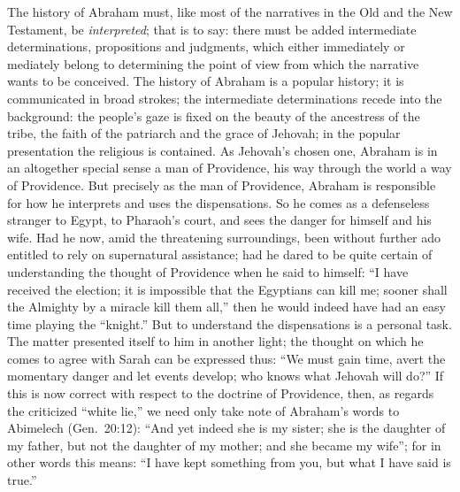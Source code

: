 \documentclass[12pt]{book}
\newcommand{\opage}[1]{\marginnote{\footnotesize\textit{[#1]}}}
\begin{document}
The history of Abraham must, like most of the narratives in the Old and
the New Testament, be \emph{interpreted}; that is to say: there must be
added intermediate determinations, propositions and judgments, which
either immediately or mediately belong to determining the point of view
from which the narrative wants to be conceived. The history of Abraham
is a popular history; it is communicated in broad strokes; the
intermediate determinations recede into the background: the people's
gaze is fixed on the beauty of the ancestress of the tribe, the faith of
the patriarch and the grace of Jehovah; in the popular presentation the
religious is contained. As Jehovah's chosen one, Abraham is in an
altogether special sense a man of Providence, his way through the world
a way of Providence. But precisely as the man of Providence, Abraham is
responsible for how he interprets and uses the dispensations. So he
comes as a defenseless stranger to Egypt, to Pharaoh's court, and sees
the danger for himself and his wife. Had he now,
\opage{217}\setcounter{footnote}{0}%
amid the threatening surroundings, been without further ado entitled to
rely on supernatural assistance; had he dared to be quite certain of
understanding the thought of Providence when he said to himself: ``I
have received the election; it is impossible that the Egyptians can
kill me; sooner shall the Almighty by a miracle kill them all,'' then he
would indeed have had an easy time playing the ``knight.'' But to
understand the dispensations is a personal task. The matter presented
itself to him in another light; the thought on which he comes to agree
with Sarah can be expressed thus: ``We must gain time, avert the
momentary danger and let events develop; who knows what Jehovah will
do?''
If this is now correct with respect to the doctrine of Providence, then,
as regards the criticized ``white lie,'' we need only take note of
Abraham's words to Abimelech (Gen.~20:12): ``And yet indeed she is my
sister; she is the daughter of my father, but not the daughter of my
mother; and she became my wife''; for in other words this means: ``I
have kept something from you, but what I have said is true.''
\end{document}
